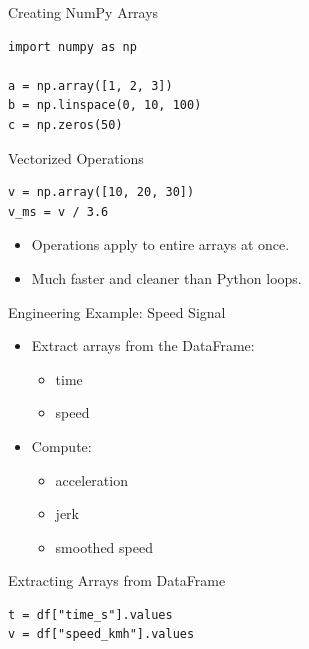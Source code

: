 \documentclass[aspectratio=169]{beamer}
\begin{document}
\begin{frame}[fragile]{Creating NumPy Arrays}
\begin{verbatim}
import numpy as np

a = np.array([1, 2, 3])
b = np.linspace(0, 10, 100)
c = np.zeros(50)
\end{verbatim}
\end{frame}

\begin{frame}[fragile]{Vectorized Operations}
\begin{verbatim}
v = np.array([10, 20, 30])
v_ms = v / 3.6
\end{verbatim}

\begin{itemize}
  \item Operations apply to entire arrays at once.
  \item Much faster and cleaner than Python loops.
\end{itemize}
\end{frame}

\begin{frame}{Engineering Example: Speed Signal}
  \begin{itemize}
    \item Extract arrays from the DataFrame:
      \begin{itemize}
        \item time
        \item speed
      \end{itemize}
    \item Compute:
      \begin{itemize}
        \item acceleration
        \item jerk
        \item smoothed speed
      \end{itemize}
  \end{itemize}
\end{frame}

\begin{frame}[fragile]{Extracting Arrays from DataFrame}
\begin{verbatim}
t = df["time_s"].values
v = df["speed_kmh"].values
\end{verbatim}
\end{frame}
\end{document}
